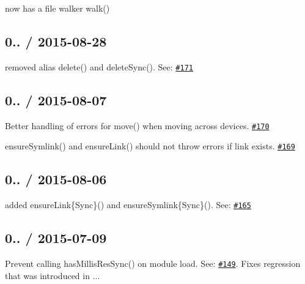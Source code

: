\begin{DoxyItemize}
\item now has a file walker {\ttfamily walk()}
\end{DoxyItemize}

\subsection*{0.. / 2015-\/08-\/28 }


\begin{DoxyItemize}
\item removed alias {\ttfamily delete()} and {\ttfamily delete\+Sync()}. See\+: \href{https://github.com/jprichardson/node-fs-extra/issues/171}{\tt \#171}
\end{DoxyItemize}

\subsection*{0.. / 2015-\/08-\/07 }


\begin{DoxyItemize}
\item Better handling of errors for {\ttfamily move()} when moving across devices. \href{https://github.com/jprichardson/node-fs-extra/pull/170}{\tt \#170}
\item {\ttfamily ensure\+Symlink()} and {\ttfamily ensure\+Link()} should not throw errors if link exists. \href{https://github.com/jprichardson/node-fs-extra/pull/169}{\tt \#169}
\end{DoxyItemize}

\subsection*{0.. / 2015-\/08-\/06 }


\begin{DoxyItemize}
\item added {\ttfamily ensure\+Link\{Sync\}()} and {\ttfamily ensure\+Symlink\{Sync\}()}. See\+: \href{https://github.com/jprichardson/node-fs-extra/pull/165}{\tt \#165}
\end{DoxyItemize}

\subsection*{0.. / 2015-\/07-\/09 }


\begin{DoxyItemize}
\item Prevent calling {\ttfamily has\+Millis\+Res\+Sync()} on module load. See\+: \href{https://github.com/jprichardson/node-fs-extra/issues/149}{\tt \#149}. Fixes regression that was introduced in {..}.
\end{DoxyItemize}

